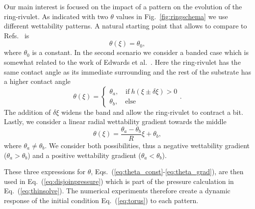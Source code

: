 \documentclass[twoside,twocolumn,9pt]{article}
\begin{document}
Our main interest is focused on the impact of a pattern on the evolution of the ring-rivulet. 
As indicated with two $\theta$ values in Fig.~\ref{fig:ringschema} we use different wettability patterns.
A natural starting point that allows to compare to Refs.~\cite{gonzalezStabilityLiquidRing2013, nguyenCompetitionCollapseBreakup2012, wuBreakupPatternedNanoscale2010} is
\begin{equation}\label{eq:theta_const}
    \theta(\xi) = \theta_0,
\end{equation}
where $\theta_0$ is a constant.
In the second scenario we consider a banded case which is somewhat related to the work of Edwards et al.~\cite{edwardsControllingBreakupToroidal2021}. 
Here the ring-rivulet has the same contact angle as its immediate surrounding and the rest of the substrate has a higher contact angle
\begin{equation}\label{eq:theta_band}
    \theta(\xi) =\begin{cases}
        \theta_a,\quad \text{if}~h(\xi\pm \delta\xi) > 0\\
        \theta_b,\quad \text{else}
    \end{cases}.
\end{equation}
The addition of $\delta\xi$ widens the band and allow the ring-rivulet to contract a bit.  
Lastly, we consider a linear radial wettability gradient towards the middle
\begin{equation}\label{eq:theta_grad}
    \theta(\xi) = \frac{\theta_{a}-\theta_{b}}{R} \xi + \theta_{b},
\end{equation}
where $\theta_{a}\neq\theta_{b}$.
We consider both possibilities, thus a negative wettability gradient ($\theta_a > \theta_b$) and a positive wettability gradient ($\theta_a < \theta_b$).

These three expressions for $\theta$, Eqs.~(\ref{eq:theta_const}-\ref{eq:theta_grad}), are then used in Eq.~(\ref{eq:disjoinpressure}) which is part of the pressure calculation in Eq.~(\ref{eq:thinsolve}).
The numerical experiments therefore create a dynamic response of the initial condition Eq.~(\ref{eq:torus}) to each pattern.
\end{document}
